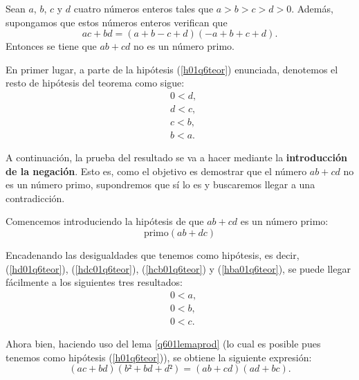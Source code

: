 \begin{teorema}[imo2001q6]
  Sean \(a\), \(b\), \(c\) y \(d\) cuatro números enteros tales que
  \(a > b > c > d > 0\). Además, supongamos que estos números enteros
  verifican que
    \begin{equation}\tag{h}\label{h01q6teor}
      ac+bd = (a+b-c+d)(-a+b+c+d).
    \end{equation}
    Entonces se tiene que \(ab+cd\) no es un número primo.
\end{teorema}
\begin{demostracion}
  En primer lugar, a parte de la hipótesis (\ref{h01q6teor}) enunciada,
  denotemos el resto de hipótesis del teorema como sigue:
  \begin{align}
    &0<d,\tag{hd}\label{hd01q6teor}\\
    &d<c,\tag{hdc}\label{hdc01q6teor}\\
    &c<b,\tag{hcb}\label{hcb01q6teor}\\
    &b<a.\tag{hba}\label{hba01q6teor}
  \end{align}

  A continuación, la prueba del resultado se va a hacer mediante la
  \textbf{introducción de la negación}. Esto es, como el objetivo es demostrar
  que el número \(ab+cd\) no es un número primo, supondremos que sí lo es y
  buscaremos llegar a una contradicción.

  Comencemos introduciendo la hipótesis de que \(ab+cd\) es un número primo:
  \begin{equation}\tag{h1}\label{h101q6teor}
    \text{primo}(ab+dc)
  \end{equation}

  Encadenando las desigualdades que tenemos como hipótesis, es decir,
  (\ref{hd01q6teor}), (\ref{hdc01q6teor}), (\ref{hcb01q6teor}) y
  (\ref{hba01q6teor}), se puede llegar fácilmente a los siguientes tres
  resultados:
  \begin{align}
    &0<a,\tag{ha}\label{ha01q6teor}\\
    &0<b,\tag{hb}\label{hb01q6teor}\\
    &0<c.\tag{hc}\label{hc01q6teor}
  \end{align}

  Ahora bien, haciendo uso del lema \ref{q601lemaprod} (lo cual es posible
  pues tenemos como hipótesis (\ref{h01q6teor})), se obtiene la siguiente
  expresión:
  \begin{equation}\tag{h2}
    (ac+bd)(b²+bd+d²) = (ab+cd)(ad+bc).
  \end{equation}


\end{demostracion}
